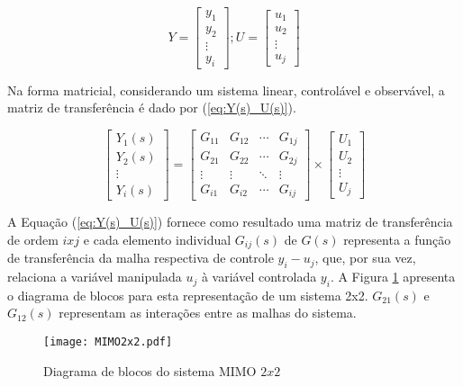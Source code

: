 \begin{equation}
\label{eq:Y_U}
Y = \left[ \begin{array}{c} y_1 \\ y_2 \\ \vdots \\ y_i \end{array} \right];
U = \left[ \begin{array}{c} u_1 \\ u_2 \\ \vdots \\ u_j \end{array} \right]
\end{equation}


Na forma matricial, considerando um sistema linear, controlável e observável, a matriz de transferência é dado por (\ref{eq:Y(s)_U(s)}).

\begin{equation}
\label{eq:Y(s)_U(s)}
\left[ \begin{array}{c} Y_1(s) \\ Y_2(s) \\ \vdots \\ Y_i(s) \end{array} \right] = \begin{bmatrix}
G_{11} & G_{12} & \cdots & G_{1j} \\ 
G_{21} & G_{22} & \cdots & G_{2j} \\ 
\vdots & \vdots & \ddots & \vdots \\ 
G_{i1} & G_{i2} & \cdots & G_{ij}
\end{bmatrix} \times
\left[ \begin{array}{c} U_1 \\ U_2 \\ \vdots \\ U_j \end{array} \right]
\end{equation}


A Equação (\ref{eq:Y(s)_U(s)}) fornece como resultado uma matriz de transferência de ordem $ixj$ e cada elemento individual $G_{ij}(s)$ de $G(s)$ representa a função de transferência da malha respectiva de controle $y_i - u_j$, que, por sua vez, relaciona a variável manipulada $u_j$ à variável controlada $y_i$. A Figura \ref{fig:mimo_2x2} apresenta o diagrama de blocos para esta representação de um sistema 2x2. $G_{21}(s)$ e $G_{12}(s)$ representam as interações entre as malhas do sistema.

\begin{figure}[!h]
	\caption{\label{fig:mimo_2x2}Diagrama de blocos do sistema MIMO $2x2$}
	\begin{center}
		\texttt{[image: MIMO2x2.pdf]}
	\end{center}
\end{figure}

